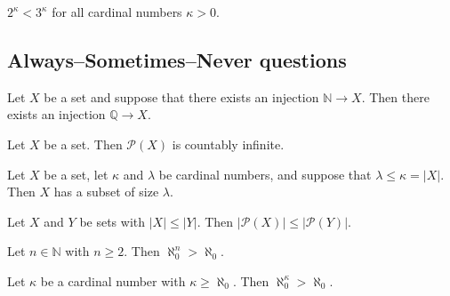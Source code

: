 \begin{chapex} %
\label{cqInfinityTFEnd}
$2^{\kappa} < 3^{\kappa}$ for all cardinal numbers $\kappa > 0$.
\end{chapex}

\subsection*{Always--Sometimes--Never questions}


\begin{chapex} %
\label{cqInfinityASNBegin}
Let $X$ be a set and suppose that there exists an injection $\mathbb{N} \to X$. Then there exists an injection $\mathbb{Q} \to X$.
\end{chapex}

\begin{chapex} %
Let $X$ be a set. Then $\mathcal{P}(X)$ is countably infinite.
\end{chapex}

\begin{chapex} %
Let $X$ be a set, let $\kappa$ and $\lambda$ be cardinal numbers, and suppose that $\lambda \le \kappa = |X|$. Then $X$ has a subset of size $\lambda$.
\end{chapex}

\begin{chapex} %
Let $X$ and $Y$ be sets with $|X| \le |Y|$. Then $|\mathcal{P}(X)| \le |\mathcal{P}(Y)|$.
\end{chapex}

\begin{chapex} %
Let $n \in \mathbb{N}$ with $n \ge 2$. Then $\aleph_0^n > \aleph_0$.
\end{chapex}

\begin{chapex} %
\label{cqInfinityASNEnd}
Let $\kappa$ be a cardinal number with $\kappa \ge \aleph_0$. Then $\aleph_0^{\kappa} > \aleph_0$.
\end{chapex}


